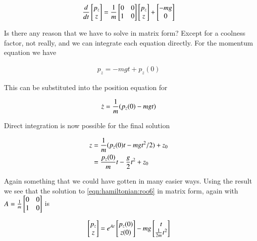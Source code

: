\begin{align}\label{eqn:hamiltonian:roo6}
\frac{d}{dt}
\begin{bmatrix}
p_z \\
z \\
\end{bmatrix}
=
\frac{1}{m}
\begin{bmatrix}
0 & 0 \\
1 & 0 \\
\end{bmatrix}
\begin{bmatrix}
p_z \\
z \\
\end{bmatrix}
+
\begin{bmatrix}
-m g \\
0 \\
\end{bmatrix}
\end{align}

Is there any reason that we have to solve in matrix form?  Except for a coolness factor, not really, and we can integrate each equation directly.  For the momentum equation we have

\begin{align}\label{eqn:hamiltonian:roo7}
p_z = - m g t + p_z(0)
\end{align}

This can be substituted into the position equation for

\begin{align}\label{eqn:hamiltonian:roo8}
\dot{z} = \frac{1}{m} (p_z(0) - m g t)
\end{align}

Direct integration is now possible for the final solution

\begin{align*}
z 
&= \frac{1}{m} (p_z(0) t - m g t^2/2) + z_0 \\
&= \frac{p_z(0)}{m} t - \frac{g}{2} t^2 + z_0 
\end{align*}

Again something that we could have gotten in many easier ways.  Using the result we see that the solution to \ref{eqn:hamiltonian:roo6} in matrix form, again with $A = \frac{1}{m}\begin{bmatrix}0 & 0 \\ 1 & 0\end{bmatrix}$ is

\begin{align}\label{eqn:hamiltonian:roo9}
\begin{bmatrix}
p_z \\
z \\
\end{bmatrix}
= e^{At} 
\begin{bmatrix}
p_z(0) \\
z(0) \\
\end{bmatrix}
- m g 
\begin{bmatrix}
t \\
\frac{1}{2m} t^2
\end{bmatrix}
\end{align}

